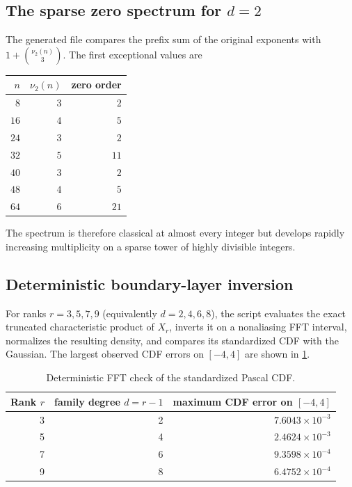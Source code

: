 \documentclass[11pt,oneside]{article}
\numberwithin{equation}{section}
\theoremstyle{definition}
\theoremstyle{remark}
\begin{document}
\subsection{The sparse zero spectrum for $d=2$}

The generated file  compares the prefix sum of the original
exponents with $1+\binom{\nu_2(n)}3$.  The first exceptional values are
\begin{center}
\begin{tabular}{@{}r r r@{}}
\toprule
$n$ & $\nu_2(n)$ & zero order\\
\midrule
$8$ & $3$ & $2$\\
$16$ & $4$ & $5$\\
$24$ & $3$ & $2$\\
$32$ & $5$ & $11$\\
$40$ & $3$ & $2$\\
$48$ & $4$ & $5$\\
$64$ & $6$ & $21$\\
\bottomrule
\end{tabular}
\end{center}
The spectrum is therefore classical at almost every integer but develops rapidly increasing
multiplicity on a sparse tower of highly divisible integers.

\subsection{Deterministic boundary-layer inversion}

For ranks $r=3,5,7,9$ (equivalently $d=2,4,6,8$), the script evaluates the exact truncated
characteristic product of $X_r$, inverts it on a nonaliasing FFT interval, normalizes the
resulting density, and compares its standardized CDF with the Gaussian.  The largest observed
CDF errors on $[-4,4]$ are shown in \cref{tab:boundary-errors}.

\begin{table}[htbp]
\centering
\small
\caption{Deterministic FFT check of the standardized Pascal CDF.}
\label{tab:boundary-errors}
\begin{tabular}{@{}r r r@{}}
\toprule
Rank $r$ & family degree $d=r-1$ & maximum CDF error on $[-4,4]$\\
\midrule
3 & 2 & $7.6043\times10^{-3}$\\
5 & 4 & $2.4624\times10^{-3}$\\
7 & 6 & $9.3598\times10^{-4}$\\
9 & 8 & $6.4752\times10^{-4}$\\
\bottomrule
\end{tabular}
\end{table}
\end{document}
